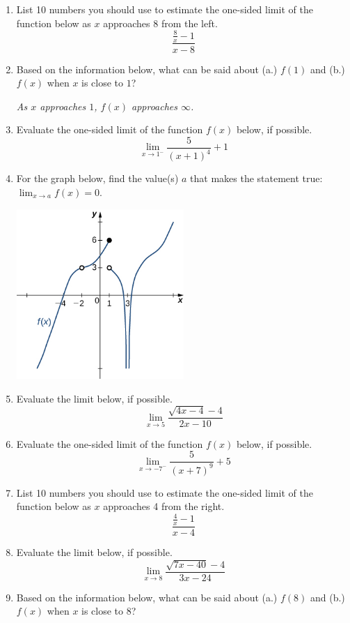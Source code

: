 \documentclass[14pt]{extbook}
\begin{document}
\begin{enumerate}
{\begin{center}
\end{center}
} \newpage
\item{
List 10 numbers you should use to estimate the one-sided limit of the function below as $x$ approaches 8 from the left.\[ \frac{\frac{8}{x} - 1}{x - 8} \]} \newpage
\item{
Based on the information below, what can be said about (a.) $f(1)$ and (b.) $f(x)$ when $x$ is close to $1$?
\begin{center}
    \textit{ As $x$ approaches $1$, $f(x)$ approaches $\infty$. }
\end{center}
} \newpage
\item{
Evaluate the one-sided limit of the function $f(x)$ below, if possible.\[ \lim_{x \rightarrow 1^-} \frac{5}{(x+1)^4}+1 \]} \newpage
\item{
For the graph below, find the value(s) $a$ that makes the statement true: $ \displaystyle \lim_{x \rightarrow a} f(x) = 0$.
\begin{center}
    \includegraphics[width=0.5\textwidth]{../Figures/evaluateLimitGraphicallyCopyB.png}
\end{center}
} \newpage
\item{
Evaluate the limit below, if possible.\[ \lim_{x \rightarrow 5} \frac{\sqrt{4x - 4} - 4}{2x - 10} \]} \newpage
\item{
Evaluate the one-sided limit of the function $f(x)$ below, if possible.\[ \lim_{x \rightarrow -7^-} \frac{5}{(x+7)^9}+5 \]} \newpage
\item{
List 10 numbers you should use to estimate the one-sided limit of the function below as $x$ approaches 4 from the right.\[ \frac{\frac{4}{x} - 1}{x - 4} \]} \newpage
\item{
Evaluate the limit below, if possible.\[ \lim_{x \rightarrow 8} \frac{\sqrt{7x - 40} - 4}{3x - 24} \]} \newpage
\item{
Based on the information below, what can be said about (a.) $f(8)$ and (b.) $f(x)$ when $x$ is close to $8$?
}
\end{enumerate}
\end{document}

